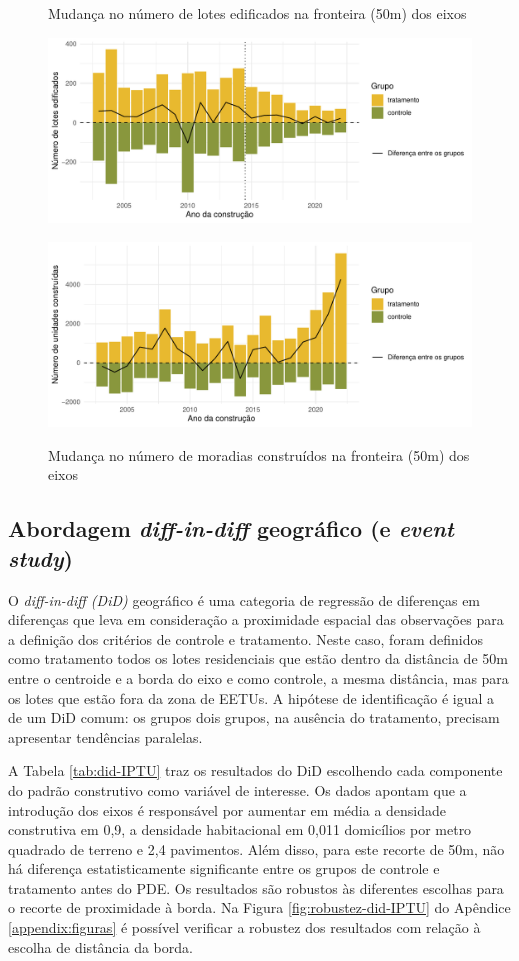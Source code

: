 \begin{figure}[h]
    \centering
    \caption{Mudança no número de lotes edificados  na fronteira (50m) dos eixos}
    \includegraphics[width = .8\textwidth]{figuras/IPTU-delta-lotes.pdf}
    \label{fig:delta-IPTU-lotes}

    \caption{Mudança no número de moradias construídos na fronteira (50m) dos eixos}
    \includegraphics[width = .8\textwidth]{figuras/IPTU-delta-unidades.pdf}
    \label{fig:delta-IPTU-unidades}
\end{figure}

\subsection{Abordagem \textit{diff-in-diff} geográfico (e \textit{event study})}
\label{subsec:perg2-did}
O \textit{diff-in-diff (DiD)} geográfico é uma categoria de regressão de diferenças em diferenças que leva em consideração a proximidade espacial das observações para a definição dos critérios de controle e tratamento. Neste caso, foram definidos como tratamento todos os lotes residenciais que estão dentro da distância de 50m entre o centroide e a borda do eixo e como controle, a mesma distância, mas para os lotes que estão fora da zona de EETUs. A hipótese de identificação é igual a de um DiD comum: os grupos dois grupos, na ausência do tratamento, precisam apresentar tendências paralelas. 



A Tabela \ref{tab:did-IPTU} traz os resultados do DiD escolhendo cada componente do padrão construtivo como variável de interesse. Os dados apontam que a introdução dos eixos é responsável por aumentar em média a densidade construtiva em 0,9, a densidade habitacional em 0,011 domicílios por metro quadrado de terreno e 2,4 pavimentos. Além disso, para este recorte de 50m, não há diferença estatisticamente significante entre os grupos de controle e tratamento antes do PDE. Os resultados são robustos às diferentes escolhas para o recorte de proximidade à borda. Na Figura \ref{fig:robustez-did-IPTU} do Apêndice \ref{appendix:figuras} é possível verificar a robustez dos resultados com relação à escolha de distância da borda. 

